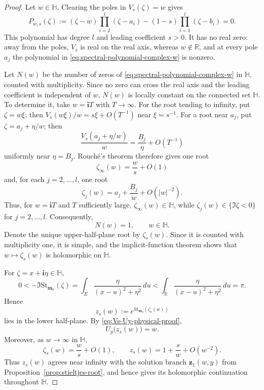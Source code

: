 \documentclass[11pt]{amsart}
\theoremstyle{plain}
\newcommand\bm{\mathbf{m}}
\numberwithin{equation}{section}
\numberwithin{theorem}{section}
\numberwithin{figure}{section}
\begin{document}
\begin{proof}
Let $w\in\mathbb H$. Clearing the poles in $V_s(\zeta)=w$ gives
\begin{equation}
    P_{w,s}(\zeta)
    :=
    (\zeta-w)\prod_{i=2}^{l}(\zeta-a_i)
    -(1-s)\prod_{i=1}^{l}(\zeta-b_i)
    =0.
    \label{eq:spectral-polynomial-complex-w}
\end{equation}
This polynomial has degree $l$ and leading coefficient $s>0$. It has
no real zero: away from the poles, $V_s$ is real on the real axis,
whereas $w\notin\mathbb R$, and at every pole $a_j$ the polynomial in
\eqref{eq:spectral-polynomial-complex-w} is nonzero.

Let $N(w)$ be the number of zeros of
\eqref{eq:spectral-polynomial-complex-w} in $\mathbb H$, counted with
multiplicity. Since no zero can cross the real axis and the leading
coefficient is independent of $w$, $N(w)$ is locally constant on the
connected set $\mathbb H$. To determine it, take $w=\mathbf iT$ with
$T\to\infty$. For the root tending to infinity, put $\zeta=w\xi$;
then $V_s(w\xi)/w=s\xi+O(T^{-1})$ near $\xi=s^{-1}$. For a root near
$a_j$, put $\zeta=a_j+\eta/w$; then
\[
    \frac{V_s(a_j+\eta/w)}{w}
    =
    \frac{B_j}{\eta}+O(T^{-1})
\]
uniformly near $\eta=B_j$. Rouch\'e's theorem therefore gives one root
\[
    \zeta_\infty(w)=\frac{w}{s}+O(1)
\]
and, for each $j=2,\ldots,l$, one root
\[
    \zeta_j(w)
    =
    a_j+\frac{B_j}{w}+O(|w|^{-2}).
\]
Thus, for $w=\mathbf iT$ and $T$ sufficiently large,
$\zeta_\infty(w)\in\mathbb H$, while
$\zeta_j(w)\in\{\Im\zeta<0\}$ for $j=2,\ldots,l$. Consequently,
\[
    N(w)=1,
    \qquad w\in\mathbb H.
\]
Denote the unique upper-half-plane root by $\zeta_s(w)$. Since it is
counted with multiplicity one, it is simple, and the implicit-function
theorem shows that $w\mapsto\zeta_s(w)$ is holomorphic on $\mathbb H$.

For $\zeta=x+\mathbf i\eta\in\mathbb H$,
\begin{equation}
    0
    <
    -\Im\mathrm{St}_{\bm_0}(\zeta)
    =
    \int_E
    \frac{\eta}{(x-u)^2+\eta^2}\,du
    <
    \int_{\mathbb R}
    \frac{\eta}{(x-u)^2+\eta^2}\,du
    =
    \pi.
    \label{eq:St-m0-imaginary-range}
\end{equation}
Hence
\[
    z_s(w)
    :=
    e^{\mathrm{St}_{\bm_0}(\zeta_s(w))}
\]
lies in the lower half-plane. By
\eqref{eq:Vs-Uy-physical-proof},
\[
    U_y\bigl(z_s(w)\bigr)=w.
\]
Moreover, as $w\to\infty$ in $\mathbb H$,
\[
    \zeta_s(w)=\frac{w}{s}+O(1),
    \qquad
    z_s(w)=1+\frac{s}{w}+O(w^{-2}).
\]
Thus $z_s(w)$ agrees near infinity with the solution branch
$\mathbf z_1(w,y)$ from
Proposition~\ref{prop:stieltjes-root}, and hence gives its holomorphic
continuation throughout $\mathbb H$.


\end{proof}
\end{document}
